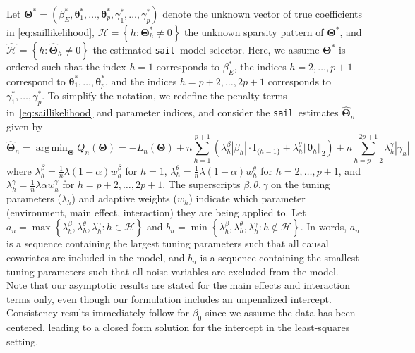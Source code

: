 \documentclass[12pt,letter]{article}\usepackage[]{graphicx}\usepackage[]{color}
\newcommand{\sail}{\texttt{sail}}
\newcommand{\bTheta}{\boldsymbol{\Theta}}
\newcommand{\btheta}{\boldsymbol{\theta}}
\DeclareMathOperator*{\argmin}{arg\,min}
\newcommand{\bThetastar}{\boldsymbol{\Theta}^{*}}
\begin{document}
Let $\bThetastar = (\beta_{E}^*,\btheta_{1}^*,\ldots,\btheta_{p}^*,\gamma_{1}^*,\ldots,\gamma_{p}^*)$ denote the unknown vector of true coefficients in \eqref{eq:saillikelihood}, $\mathcal{H}=\left\lbrace h : \bThetastar_h \neq 0 \right\rbrace$ the unknown sparsity pattern of $\bThetastar$, and $\widehat{\mathcal{H}} =\left\lbrace h : \widehat{\bTheta}_h \neq 0 \right\rbrace$ the estimated \sail ~model selector. Here, we assume $\bThetastar$ is ordered such that the index $h=1$ corresponds to $\beta_E^*$, the indices $h=2, \ldots, p+1$ correspond to $\btheta_{1}^*,\ldots,\btheta_{p}^*$, and the indices $h=p+2, \ldots, 2p+1$ corresponds to $\gamma_{1}^*,\ldots,\gamma_{p}^*$. To simplify the notation, we redefine the penalty terms in~\eqref{eq:saillikelihood} and parameter indices, and consider the \sail ~estimates $\widehat{\bTheta}_n$ given by 
\begin{equation}
\widehat{\bTheta}_n=  \argmin_{\bTheta}Q_n(\bTheta)
=-L_n(\bTheta)+n\sum_{h=1}^{p+1} \left( \lambda_{h}^{\beta}\left|\beta_{h}\right| \cdot \textrm{I}_{\lbrace h=1 \rbrace} +   \lambda_{h}^{\theta}\left\Vert \btheta_{h}\right\Vert _{2}\right)  +n\sum_{h=p+2}^{2p+1}\lambda_{h}^{\gamma}\left|\gamma_{h}\right|
\end{equation}
where $\lambda_{h}^\beta=\frac{{1}}{n}\lambda(1-\alpha)w_{h}^\beta$ for $h=1$, $\lambda_{h}^{\theta}=\frac{{1}}{n}\lambda(1-\alpha)w_{h}^\theta$ for $h=2, \ldots, p+1$, and $\lambda_{h}^{\gamma}=\frac{{1}}{n}\lambda\alpha w_{h}^\gamma$ for $h=p+2, \ldots, 2p+1$. The superscripts $\beta,\theta, \gamma$ on the tuning parameters ($\lambda_h$) and adaptive weights ($w_h$) indicate which parameter (environment, main effect, interaction) they are being applied to. Let $a_n = \max \left\lbrace \lambda_{h}^\beta, \lambda_{h}^\theta, \lambda_h^\gamma: h \in \mathcal{H}  \right\rbrace$ and $b_n = \min \left\lbrace \lambda_{h}^\beta, \lambda_{h}^\theta, \lambda_h^\gamma: h \notin \mathcal{H}  \right\rbrace$. In words, $a_n$ is a sequence containing the largest tuning parameters such that all causal covariates are included in the model, and $b_n$ is a sequence containing the smallest tuning parameters such that all noise variables are excluded from the model. Note that our asymptotic results are stated for the main effects and interaction terms only, even though our formulation includes an unpenalized intercept. Consistency results immediately follow for $\beta_0$ since we assume the data has been centered, leading to a closed form solution for the intercept in the least-squares setting. 
\end{document}
